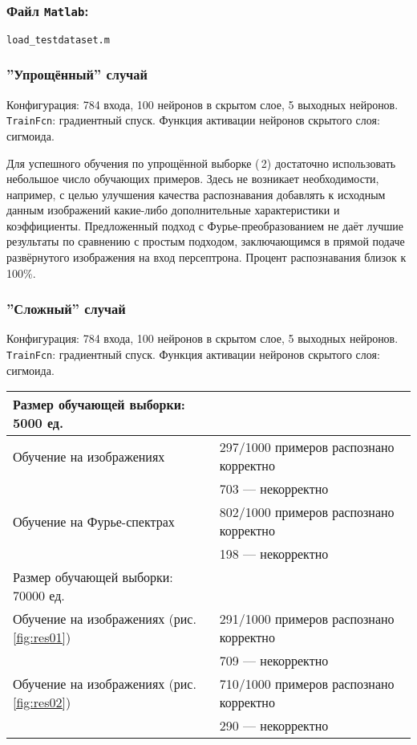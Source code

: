 \documentclass[12pt,a4paper]{article}
\begin{document}
\subsubsection*{Файл \texttt{Matlab}:}
\verb|load_testdataset.m|\\ 

\subsubsection*{''Упрощённый'' случай}
Конфигурация: 784 входа, 100 нейронов в скрытом слое, 5 выходных нейронов. \texttt{TrainFcn}: градиентный спуск. Функция активации нейронов скрытого слоя: сигмоида.

Для успешного обучения по упрощённой выборке (\textnumero\,2) 
достаточно использовать небольшое число обучающих примеров. 
Здесь не возникает необходимости, например, с целью улучшения качества распознавания добавлять к исходным данным изображений какие-либо дополнительные характеристики и коэффициенты. Предложенный подход с Фурье-преобразованием не даёт лучшие результаты по сравнению с простым подходом, заключающимся в прямой подаче развёрнутого изображения на вход персептрона. Процент распознавания близок к 100\%.

\subsubsection*{''Сложный'' случай}
Конфигурация: 784 входа, 100 нейронов в скрытом слое, 5 выходных нейронов. \texttt{TrainFcn}: градиентный спуск. Функция активации нейронов скрытого слоя: сигмоида.

\begin{table}[H]
	\begin{tabular}{|ll|}
		\hline
		Размер обучающей выборки: 5000 ед. & \\
		\hline\hline
		Обучение на изображениях &297/1000 примеров распознано корректно\\
		&703 --- некорректно\\
		Обучение на Фурье-спектрах  &802/1000 примеров распознано корректно\\
		&198 --- некорректно\\
		\hline\hline
		Размер обучающей выборки: 70000 ед. &\\
		\hline\hline
		Обучение на изображениях (рис.\,\ref{fig:res01}) &291/1000 примеров распознано корректно\\
		&709 --- некорректно\\
		Обучение на изображениях (рис.\,\ref{fig:res02}) &710/1000 примеров распознано корректно\\
		&290 --- некорректно\\
		\hline
	\end{tabular}
\end{table}
\end{document}
